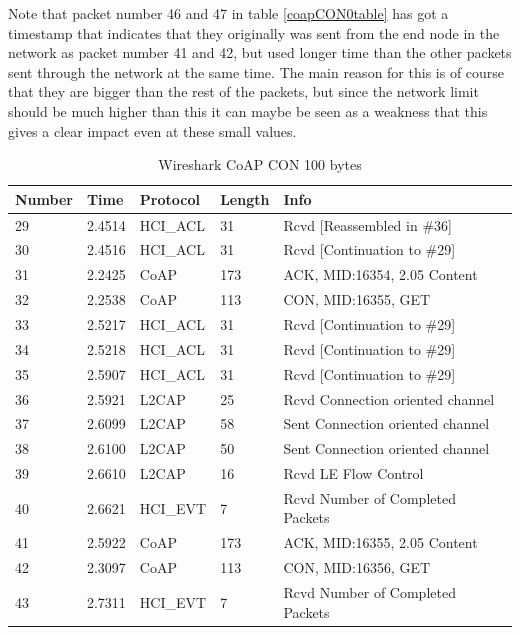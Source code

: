 \noindent Note that packet number 46 and 47 in table \ref{coapCON0table} has got a timestamp that indicates that they originally was sent from the end node in the network as packet number 41 and 42, but used longer time than the other packets sent through the network at the same time. The main reason for this is of course that they are bigger than the rest of the packets, but since the network limit should be much higher than this it can maybe be seen as a weakness that this gives a clear impact even at these small values.  


\begin{table}[]
\centering
\caption{Wireshark CoAP CON 100 bytes}
\label{coapCON100table}
\begin{tabular}{lllll}
Number & Time   & Protocol & Length & Info                             \\ \hline
29     & 2.4514 & HCI\_ACL & 31     & Rcvd {[}Reassembled in \#36{]}   \\
30     & 2.4516 & HCI\_ACL & 31     & Rcvd {[}Continuation to \#29{]}  \\
31     & 2.2425 & CoAP     & 173    & ACK, MID:16354, 2.05 Content     \\
32     & 2.2538 & CoAP     & 113    & CON, MID:16355, GET              \\
33     & 2.5217 & HCI\_ACL & 31     & Rcvd {[}Continuation to \#29{]}  \\
34     & 2.5218 & HCI\_ACL & 31     & Rcvd {[}Continuation to \#29{]}  \\
35     & 2.5907 & HCI\_ACL & 31     & Rcvd {[}Continuation to \#29{]}  \\
36     & 2.5921 & L2CAP    & 25     & Rcvd Connection oriented channel \\
37     & 2.6099 & L2CAP    & 58     & Sent Connection oriented channel \\
38     & 2.6100 & L2CAP    & 50     & Sent Connection oriented channel \\
39     & 2.6610 & L2CAP    & 16     & Rcvd LE Flow Control             \\
40     & 2.6621 & HCI\_EVT & 7      & Rcvd Number of Completed Packets \\
41     & 2.5922 & CoAP     & 173    & ACK, MID:16355, 2.05 Content     \\
42     & 2.3097 & CoAP     & 113    & CON, MID:16356, GET              \\ 
43     & 2.7311 & HCI\_EVT & 7      & Rcvd Number of Completed Packets \\ \hline
\end{tabular}
\end{table}


